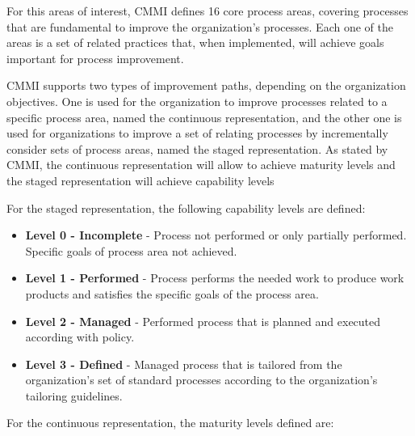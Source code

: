 For this areas of interest, CMMI defines 16 core process areas, covering processes that are fundamental to improve the organization's processes. Each one of the areas is a set of related practices that, when implemented, will achieve goals important for process improvement.\par
CMMI supports two types of improvement paths, depending on the organization objectives. One is used for the organization to improve processes related to a specific process area, named the continuous representation, and the other one is used for organizations to improve a set of relating processes by incrementally consider sets of process areas, named the staged representation. As stated by CMMI, the continuous representation will allow to achieve maturity levels and the staged representation will achieve capability levels\par
For the staged representation, the following capability levels are defined:

\begin{itemize}

\item \textbf{Level 0 - Incomplete} - Process not performed or only partially performed. Specific goals of process area not achieved.

\item \textbf{Level 1 - Performed} - Process performs the needed work to produce work products and satisfies the specific goals of the process area.

\item \textbf{Level 2 - Managed} - Performed process that is planned and executed according with policy.

\item \textbf{Level 3 - Defined} - Managed process that is tailored from the organization's set of standard processes according to the organization's tailoring guidelines.
 
\end{itemize}

For the continuous representation, the maturity levels defined are:

